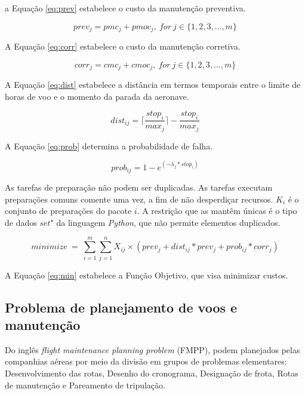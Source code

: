 \documentclass{article}
\begin{document}
a Equação \ref{eq:prev} estabelece o custo da manutenção preventiva.


\begin{equation}\label{eq:prev}
prev_j =  pmc_j + pmoc_j,\ for\ j \in \{1, 2, 3, \ldots, m\}
\end{equation}


A Equação \ref{eq:corr} estabelece o custo da manutenção corretiva.

\begin{equation}\label{eq:corr}
corr_j =  cmc_j + cmoc_j,\ for\ j \in \{1, 2, 3, \ldots, m\}
\end{equation}


A Equação  \ref{eq:dist} estabelece a distância em termos temporais entre o limite de horas de voo e o momento da parada da aeronave.

\begin{equation}\label{eq:dist}
dist_{ij} = \lceil{\frac{stop_i}{max_j}}\rceil{}-\frac{stop_i}{max_j} 
\end{equation}


A Equação  \ref{eq:prob} determina a probabilidade de falha.

\begin{equation}\label{eq:prob}
prob_{ij} = 1 - e^{(-\lambda{}_j * stop_i)}
\end{equation}

As tarefas de preparação não podem ser duplicadas. As tarefas executam preparações comuns comente uma vez, a fim de não desperdiçar recursos.
$K_i$ é o conjunto de preparações do pacote $i$. A restrição que as mantêm únicas é o tipo de dados $set$" da linguagem {\it Python}, que não permite elementos duplicados.

\begin{equation} \label{eq:min}
minimize\ =\ \sum_{i=1}^{m} \sum_{j=1}^{n} X_{ij} \times ( prev_j + dist_{ij}*prev_j + prob_{ij}*corr_j )
\end{equation}

A Equação \ref{eq:min} estabelece a Função Objetivo, que visa minimizar custos.


\subsection{Problema de planejamento de voos e manutenção}

Do inglês {\it flight maintenance planning problem} (FMPP), podem planejados pelas companhias aéreas por meio da divisão em grupos de problemas elementares: Desenvolvimento das rotas, Desenho do cronograma, Designação de frota, Rotas de manutenção e Pareamento de tripulação. 
\end{document}
